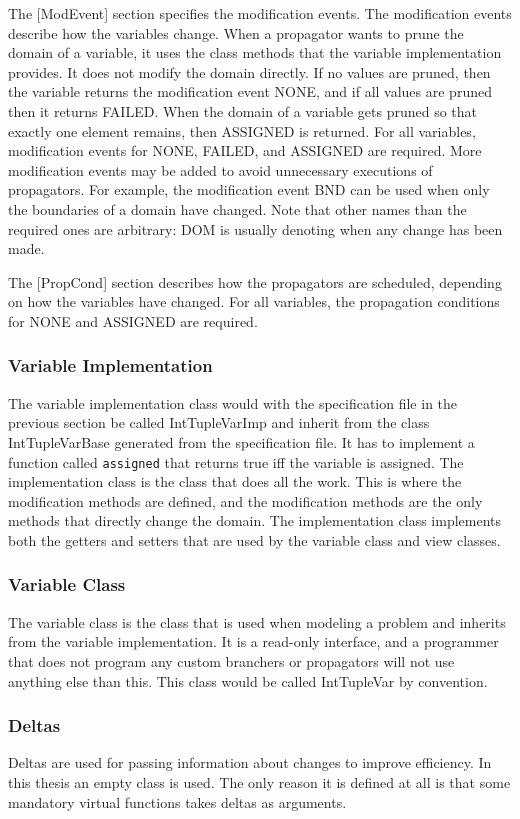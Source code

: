 \documentclass[a4paper,11pt]{article}
\begin{document}
The [ModEvent] section specifies the modification events. The modification events describe how the variables change. When a propagator wants to prune the domain of a variable, it uses the class methods that the variable implementation provides. It does not modify the domain directly. If no values are pruned, then the variable returns the modification event NONE, and if all values are pruned then it returns FAILED. When the domain of a variable gets pruned so that exactly one element remains, then ASSIGNED is returned. For all variables, modification events for NONE, FAILED, and ASSIGNED are required. More modification events may be added to avoid unnecessary executions of propagators. For example, the modification event BND can be used when only the boundaries of a domain have changed. Note that other names than the required ones are arbitrary: DOM is usually denoting when any change has been made.

The [PropCond] section describes how the propagators are scheduled, depending on how the variables have changed. For all variables, the propagation conditions for NONE and ASSIGNED are required.

\subsubsection{Variable Implementation}
The variable implementation class would with the specification file in the previous section be called IntTupleVarImp and inherit from the class IntTupleVarBase generated from the specification file. It has to implement a function called \texttt{assigned} that returns true iff the variable is assigned. The implementation class is the class that does all the work. This is where the modification methods are defined, and the modification methods are the only methods that directly change the domain. The implementation class implements both the getters and setters that are used by the variable class and view classes.

\subsubsection{Variable Class}
The variable class is the class that is used when modeling a problem and inherits from the variable implementation. It is a read-only interface, and a programmer that does not program any custom branchers or propagators will not use anything else than this. This class would be called IntTupleVar by convention.

\subsubsection{Deltas}
Deltas are used for passing information about changes to improve efficiency. In this thesis an empty class is used. The only reason it is defined at all is that some mandatory virtual functions takes deltas as arguments.
\end{document}
